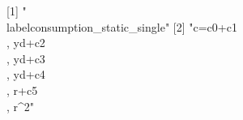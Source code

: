 [1] "\\label{consumption_static_single}"                                         
[2] "{c}={c0}+{c1}\\, {yd}+{c2}\\, {yd}+{c3}\\, {yd}+{c4}\\, {r}+{c5}\\, {r}^{2}"
